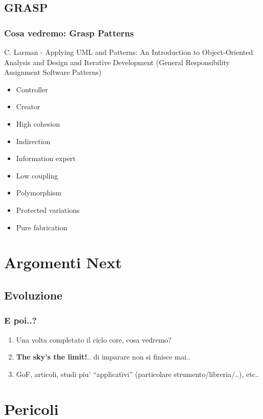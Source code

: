 \documentclass{beamer}
\begin{document}
\subsection{GRASP}
\begin{frame}
	\frametitle{Cosa vedremo: Grasp Patterns}
	C. Larman - Applying UML and Patterns: An Introduction to Object-Oriented Analysis and Design and Iterative Development (General Responsibility Assignment Software Patterns) \\
	\begin{itemize}
  		\item Controller
		\item Creator
		\item High cohesion
		\item Indirection
		\item Information expert
		\item Low coupling
		\item Polymorphism
		\item Protected variations
		\item Pure fabrication
	\end{itemize}
\end{frame}

\section{Argomenti Next}
\subsection{Evoluzione}
\begin{frame}
	\frametitle{E poi..?}
	\begin{enumerate}
  			\item<+-> Una volta completato il ciclo core, cosa vedremo?
  			\item<+-> \textbf{The sky's the limit!}.. di imparare non si finisce mai..
  			\item<+-> GoF, articoli, studi piu' ``applicativi'' (particolare strumento/libreria/..), etc..
	\end{enumerate}
\end{frame}	

\section{Pericoli}
\end{document}
